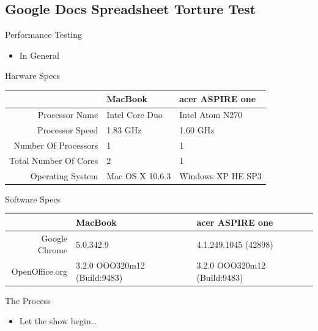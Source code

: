 \documentclass{beamer}
\begin{document}
\subsection[GDocs Spreadsheet Testing]{Google Docs Spreadsheet Torture Test}

\begin{frame}{Performance Testing}
  \begin{itemize}
  \item In General
  \end{itemize}
\end{frame}

\begin{frame}{Harware Specs}
  \resizebox{10cm}{!} {
  \begin{tabular}{| r | p{5cm} | p{5cm} |}
    \hline
                          & MacBook          & acer ASPIRE one   \\ \hline
    Processor Name        & Intel Core Duo   & Intel Atom N270   \\ \hline
    Processor Speed       & 1.83 GHz         & 1.60 GHz          \\ \hline
    Number Of Processors  & 1                & 1                 \\ \hline
    Total Number Of Cores & 2                & 1                 \\ \hline
    Operating System      & Mac OS X 10.6.3  & Windows XP HE SP3 \\ \hline
    \hline
  \end{tabular}
}
\end{frame}

\begin{frame}{Software Specs}
  \resizebox{10cm}{!} {
  \begin{tabular}{| r | p{5cm} | p{5cm} |}
    \hline
                                 & MacBook     & acer ASPIRE one \\ \hline
    Google Chrome                & 5.0.342.9                    & 4.1.249.1045 (42898)               \\ \hline
    OpenOffice.org               & 3.2.0 OOO320m12 (Build:9483) & 3.2.0 OOO320m12 (Build:9483)       \\
    \hline
  \end{tabular}
}
\end{frame}

\begin{frame}{The Process}
  \begin{itemize}
  \item Let the show begin\dots
  \end{itemize}
\end{frame}
\end{document}
